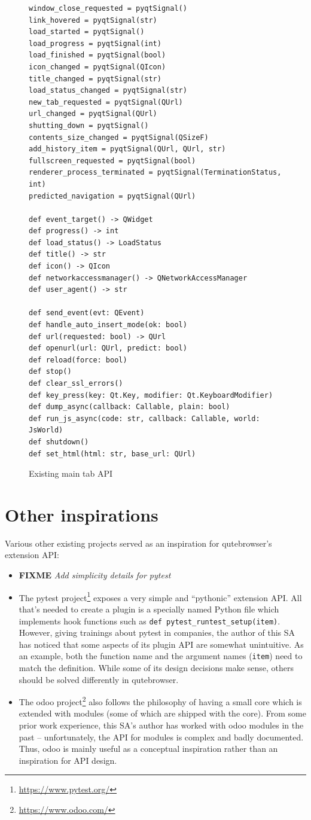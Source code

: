 \documentclass[a4paper,parskip=full]{scrreprt}
\newcommand{\py}[1]{\texttt{#1}}
\newcommand{\fixme}[1]{\textbf{FIXME} \emph{#1}}
\begin{document}
\begin{figure}
\begin{verbatim}
window_close_requested = pyqtSignal()
link_hovered = pyqtSignal(str)
load_started = pyqtSignal()
load_progress = pyqtSignal(int)
load_finished = pyqtSignal(bool)
icon_changed = pyqtSignal(QIcon)
title_changed = pyqtSignal(str)
load_status_changed = pyqtSignal(str)
new_tab_requested = pyqtSignal(QUrl)
url_changed = pyqtSignal(QUrl)
shutting_down = pyqtSignal()
contents_size_changed = pyqtSignal(QSizeF)
add_history_item = pyqtSignal(QUrl, QUrl, str)
fullscreen_requested = pyqtSignal(bool)
renderer_process_terminated = pyqtSignal(TerminationStatus, int)
predicted_navigation = pyqtSignal(QUrl)

def event_target() -> QWidget
def progress() -> int
def load_status() -> LoadStatus
def title() -> str
def icon() -> QIcon
def networkaccessmanager() -> QNetworkAccessManager
def user_agent() -> str

def send_event(evt: QEvent)
def handle_auto_insert_mode(ok: bool)
def url(requested: bool) -> QUrl
def openurl(url: QUrl, predict: bool)
def reload(force: bool)
def stop()
def clear_ssl_errors()
def key_press(key: Qt.Key, modifier: Qt.KeyboardModifier)
def dump_async(callback: Callable, plain: bool)
def run_js_async(code: str, callback: Callable, world: JsWorld)
def shutdown()
def set_html(html: str, base_url: QUrl)
\end{verbatim}
  \caption{Existing main tab API}
  \label{tabapi}
\end{figure}

\section{Other inspirations}
Various other existing projects served as an inspiration for qutebrowser's
extension API:

\begin{itemize}
  \item \fixme{Add simplicity details for pytest}
  \item The pytest project\footnote{\url{https://www.pytest.org/}} exposes a
    very simple and ``pythonic'' extension API. All that's needed to create a
    plugin is a specially named Python file which implements hook functions such
    as \py{def pytest_runtest_setup(item)}. However, giving trainings about
    pytest in companies, the author of this SA has noticed that some aspects of
    its plugin API are somewhat unintuitive. As an example, both the function
    name and the argument names (\verb|item|) need to match the definition.
    While some of its design decisions make sense, others should be solved
    differently in qutebrowser.
  \item The odoo project\footnote{\url{https://www.odoo.com/}} also follows the
    philosophy of having a small core which is extended with modules (some of
    which are shipped with the core). From some prior work experience, this SA's
    author has worked with odoo modules in the past -- unfortunately, the API
    for modules is complex and badly documented. Thus, odoo is mainly useful as
    a conceptual inspiration rather than an inspiration for API design.
\end{itemize}
\end{document}
